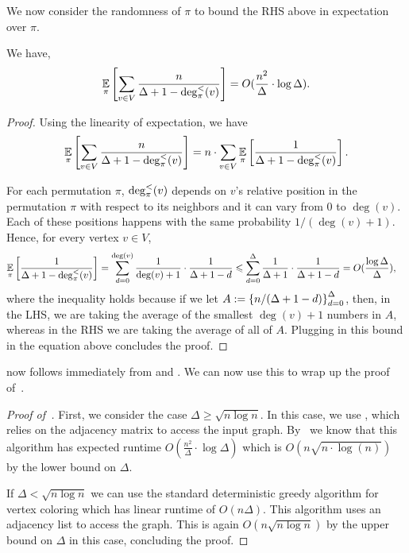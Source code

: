 We now consider the randomness of  $\pi$ to bound the RHS above in expectation over $\pi$. 
\begin{lemma}\label{lem:warmup-RHS-suffices}
	We have, 
	\[
	\operatorname*{{\mathbb{E}}}_{\pi}\left[\sum_{v \in V} \frac{n}{\Delta+1-\deg^{<}_{\pi}(v)}\right] = O(\frac{n^2}{\Delta} \cdot \log{\Delta}).
	\] 
\end{lemma}
\begin{proof}
	Using the linearity of expectation, we have
	\[
	\operatorname*{{\mathbb{E}}}_{\pi}\left[\sum_{v \in V} \frac{n}{\Delta+1-\deg^{<}_{\pi}(v)}\right] =n \cdot \sum_{v\in V} \operatorname*{{\mathbb{E}}}_{\pi}\left[\frac{1}{\Delta+1-\deg^{<}_{\pi}(v)}\right].
	\]
	
	For each permutation $\pi$, $\deg^{<}_{\pi}(v)$ depends on $v$'s relative position in the permutation $\pi$ with respect to its neighbors and it can vary from $0$ to $\deg(v)$. Each of these positions happens with the same probability ${1}/({\deg(v)+1})$. 
	Hence, for every vertex $v\in V$,
	\begin{align*}
		\operatorname*{{\mathbb{E}}}_{\pi}\left[\frac{1}{\Delta+1-\deg^{<}_{\pi}(v)}\right] &= \sum_{d=0}^{\deg(v)}\frac{1}{\deg(v)+1}\cdot \frac{1}{\Delta +1-d} \leqslant \sum_{d=0}^{\Delta}\frac{1}{\Delta+1}\cdot \frac{1}{\Delta +1-d} = O(\frac{\log{\Delta}}{\Delta}),
	\end{align*}
	where the inequality holds because if we let $A := \left\{ n/(\Delta + 1 - d) \right\}_{d=0}^{\Delta}$, then, in the LHS, we are taking the average of the smallest $\deg(v) + 1$ numbers in $A$, whereas in the RHS we are taking the average of all of $A$.
	Plugging in this bound in the equation above concludes the proof. 
\end{proof}

 now follows immediately from  and . We can now use this to wrap up the proof of~. 

\begin{proof}[Proof of~]
	
	First, we consider the case $\Delta \geq \sqrt{n\log n}$.  In this case, we use , which relies on the adjacency matrix to access the input graph.
	By~ we know that this algorithm has expected runtime $O(\frac{n^2}{\Delta} \cdot \log{\Delta})$ which is $O(n\sqrt{n\cdot \log(n)})$ by the lower bound on $\Delta$.
	
	
	If $\Delta < \sqrt{n\log n}$ we can use the standard deterministic greedy algorithm for vertex coloring which has linear runtime of $O(n\Delta)$. This algorithm uses an adjacency list to access the graph. 
	This is again $O(n\sqrt{n\log{n}})$ by the upper bound on $\Delta$ in this case, concluding the proof.
\end{proof}

